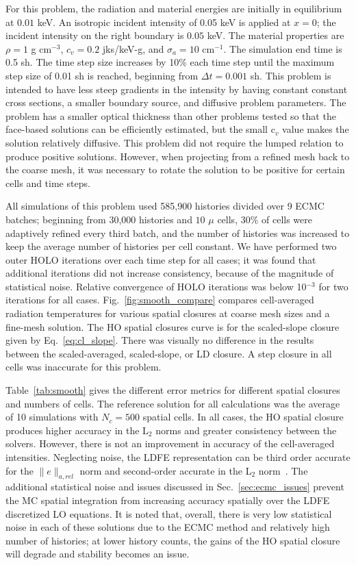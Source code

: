 For this problem, the radiation and material energies are initially in
equilibrium at $0.01$ keV.   An isotropic incident intensity of 0.05 keV is applied
at $x=0$; the incident intensity on the right boundary is $0.05$ keV.
The material properties are $\rho = 1$ g cm$^{-3}$, $c_v = 0.2$ jks/keV-g, and
$\sigma_a=10$ cm$^{-1}$.
The simulation end time is 0.5 sh.  The time step size increases by 10\% each time step
until the maximum step size of 0.01 sh is reached, beginning from $\Delta t = 0.001$ sh.
This problem is intended to have less steep gradients in the intensity by having constant constant cross
sections, a smaller boundary source, and diffusive problem parameters.
The problem has a smaller optical thickness than other problems tested so that the face-based solutions can be efficiently
estimated, but the small c$_v$ value makes the solution relatively diffusive.  This
problem did not require the lumped relation to produce positive solutions.
However, when projecting from a refined mesh back to the coarse mesh, it was
necessary to rotate the solution to be positive for certain cells and time steps.

All simulations of this problem used 585,900 histories divided over 9 ECMC
batches;  beginning from 30,000 histories and $10$ $\mu$ cells, 30\% of cells were
adaptively refined every third batch, and the number of histories was increased to
keep the average number of histories per cell constant. 
We have performed two outer HOLO iterations over each time step for all cases; it was
found that additional iterations did not increase consistency, because of the  magnitude
of statistical noise.  Relative convergence of HOLO iterations was below 10$^{-3}$
for two iterations for all cases.  
Fig.~\ref{fig:smooth_compare} compares cell-averaged radiation temperatures for various spatial closures at
coarse mesh sizes and a fine-mesh solution.  The HO spatial closures curve is for the
scaled-slope closure given by Eq.~\eqref{eq:cl_slope}.  There was visually
no difference in the results between the scaled-averaged, scaled-slope, or LD closure. A step closure in all cells
was inaccurate for this problem.

Table~\ref{tab:smooth} gives the different error metrics for different spatial
closures and numbers of cells.  The reference solution for all calculations was the average of 10 simulations with $N_c=500$ spatial
cells.  In all cases, the HO spatial closure produces higher accuracy in the L$_2$
norms and greater consistency between the solvers.  However, there is not an
improvement in accuracy of the cell-averaged intensities.  Neglecting noise, the LDFE representation can be third order
accurate for the $\|e\|_{a,rel}$ norm and second-order accurate in the L$_2$ norm~\cite{morel_ldtrt}. 
The additional statistical noise and issues discussed in Sec.~\ref{sec:ecmc_issues}
prevent the MC spatial integration from increasing accuracy spatially over the LDFE discretized LO
equations.  It is noted that, overall, there is very low statistical noise in each of these
solutions due to the ECMC method and relatively high number of histories; at lower
history counts, the gains of the HO spatial closure will degrade and stability
becomes an issue.

